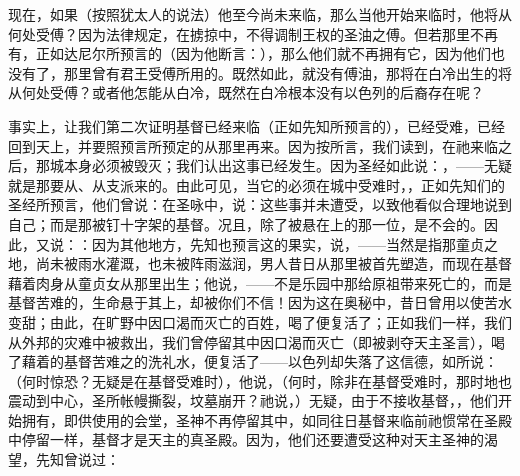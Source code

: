 现在，如果（按照犹太人的说法）他至今尚未来临，那么当他开始来临时，他将从何处受傅？因为法律规定，在掳掠中，不得调制王权的圣油之傅。但若那里不再有，正如达尼尔所预言的（因为他断言：），那么他们就不再拥有它，因为他们也没有了，那里曾有君王受傅所用的。既然如此，就没有傅油，那将在白冷出生的将从何处受傅？或者他怎能从白冷，既然在白冷根本没有以色列的后裔存在呢？\par

事实上，让我们第二次证明基督已经来临（正如先知所预言的），已经受难，已经回到天上，并要照预言所预定的从那里再来。因为按所言，我们读到，在祂来临之后，那城本身必须被毁灭；我们认出这事已经发生。因为圣经如此说：，——无疑就是那要从、从支派来的。由此可见，当它的必须在城中受难时，，正如先知们的圣经所预言，他们曾说：在圣咏中，说：这些事并未遭受，以致他看似合理地说到自己；而是那被钉十字架的基督。况且，除了被悬在上的那一位，是不会的。因此，又说：：因为其他地方，先知也预言这的果实，说，——当然是指那童贞之地，尚未被雨水灌溉，也未被阵雨滋润，男人昔日从那里被首先塑造，而现在基督藉着肉身从童贞女从那里出生；他说，——不是乐园中那给原祖带来死亡的，而是基督苦难的，生命悬于其上，却被你们不信！因为这在奥秘中，昔日曾用以使苦水变甜；由此，在旷野中因口渴而灭亡的百姓，喝了便复活了；正如我们一样，我们从外邦的灾难中被救出，我们曾停留其中因口渴而灭亡（即被剥夺天主圣言），喝了藉着的基督苦难之的洗礼水，便复活了——以色列却失落了这信德，如所说：（何时惊恐？无疑是在基督受难时），他说，（何时，除非在基督受难时，那时地也震动到中心，圣所帐幔撕裂，坟墓崩开？祂说，）无疑，由于不接收基督，，他们开始拥有，即供使用的会堂，圣神不再停留其中，如同往日基督来临前祂惯常在圣殿中停留一样，基督才是天主的真圣殿。因为，他们还要遭受这种对天主圣神的渴望，先知曾说过：\par

